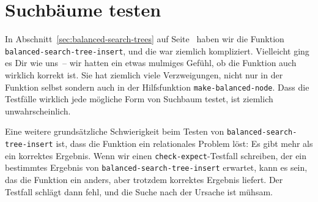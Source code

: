 \section{Suchbäume testen}

In Abschnitt~\ref{sec:balanced-search-trees} auf
Seite~\pageref{sec:balanced-search-trees} haben wir die Funktion
\lstinline{balanced-search-tree-insert}, und die war ziemlich
kompliziert.  Vielleicht ging es Dir wie uns~-- wir hatten ein etwas
mulmiges Gefühl, ob die Funktion auch wirklich korrekt ist.
Sie hat ziemlich viele Verzweigungen, nicht nur in der Funktion selbst
sondern auch in der Hilfsfunktion \lstinline{make-balanced-node}.
Dass die Testfälle wirklich jede mögliche Form von Suchbaum testet,
ist ziemlich unwahrscheinlich.

Eine weitere grundsätzliche Schwierigkeit beim Testen von
\lstinline{balanced-search-tree-insert} ist, dass die Funktion ein
relationales Problem löst: Es gibt mehr als ein korrektes
Ergebnis. Wenn wir einen \lstinline{check-expect}-Testfall schreiben,
der ein bestimmtes Ergebnis von
\lstinline{balanced-search-tree-insert} erwartet, kann es sein, das
die Funktion ein anders, aber trotzdem korrektes Ergebnis liefert.
Der Testfall schlägt dann fehl, und die Suche nach der Ursache ist
mühsam.

